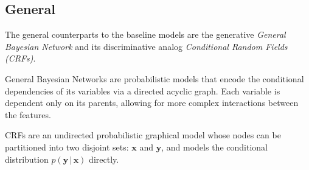 \documentclass{article}
\begin{document}
\subsection{General}
The general counterparts to the baseline models are the generative
\textit{General Bayesian Network} and its discriminative analog
\textit{Conditional Random Fields (CRFs)}.

General Bayesian Networks are probabilistic models that
encode the conditional dependencies of its variables via a directed acyclic
graph. Each variable is dependent only on its parents,
allowing for more complex interactions between the features.

CRFs are an undirected probabilistic graphical model whose
nodes can be partitioned into two disjoint sets: $\mathbf{x}$ and $\mathbf{y}$,
and models the conditional distribution $p(\mathbf{y}\, | \, \mathbf{x})$
directly.
\end{document}
